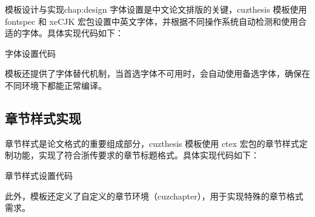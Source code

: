 \begin{cuzchapter}{模板设计与实现}{chap:design}
    字体设置是中文论文排版的关键，cuzthesis 模板使用 fontspec 和 xeCJK 宏包设置中英文字体，并根据不同操作系统自动检测和使用合适的字体。具体实现代码如下：

    \begin{listing}[htbp]
        \caption{字体设置代码}
        \label{code:font-setting}
        \begin{texcode}
            \setmainfont{Times New Roman}
            \setsansfont{Arial}
            \setmonofont{Courier New}

        \end{texcode}
    \end{listing}

    模板还提供了字体替代机制，当首选字体不可用时，会自动使用备选字体，确保在不同环境下都能正常编译。

    \subsection{章节样式实现}

    章节样式是论文格式的重要组成部分，cuzthesis 模板使用 ctex 宏包的章节样式定制功能，实现了符合浙传要求的章节标题格式。具体实现代码如下：

    \begin{listing}[htbp]
        \caption{章节样式设置代码}
        \label{code:chapter-style}
        \begin{texcode}
        \end{texcode}
    \end{listing}

    此外，模板还定义了自定义的章节环境（cuzchapter），用于实现特殊的章节格式需求。


\end{cuzchapter}
